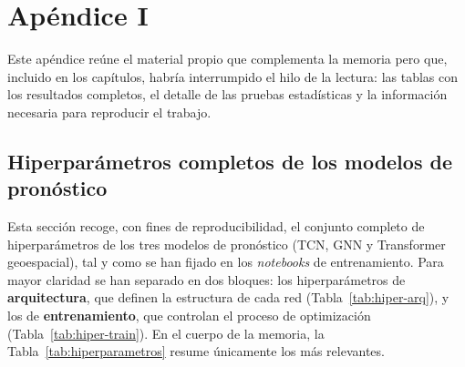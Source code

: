 \cleardoublepage

\chapter{Apéndice I}
\label{apendice-i}

Este apéndice reúne el material propio que complementa la memoria pero que, incluido en los
capítulos, habría interrumpido el hilo de la lectura: las tablas con los resultados completos, el
detalle de las pruebas estadísticas y la información necesaria para reproducir el trabajo.

\section{Hiperparámetros completos de los modelos de pronóstico}
\label{apendice-hiperparametros}

Esta sección recoge, con fines de reproducibilidad, el conjunto completo de hiperparámetros de
los tres modelos de pronóstico (TCN, GNN y Transformer geoespacial), tal y como se han fijado en
los \textit{notebooks} de entrenamiento. Para mayor claridad se han separado en dos bloques: los
hiperparámetros de \textbf{arquitectura}, que definen la estructura de cada red
(Tabla~\ref{tab:hiper-arq}), y los de \textbf{entrenamiento}, que controlan el proceso de
optimización (Tabla~\ref{tab:hiper-train}). En el cuerpo de la memoria, la
Tabla~\ref{tab:hiperparametros} resume únicamente los más relevantes.

